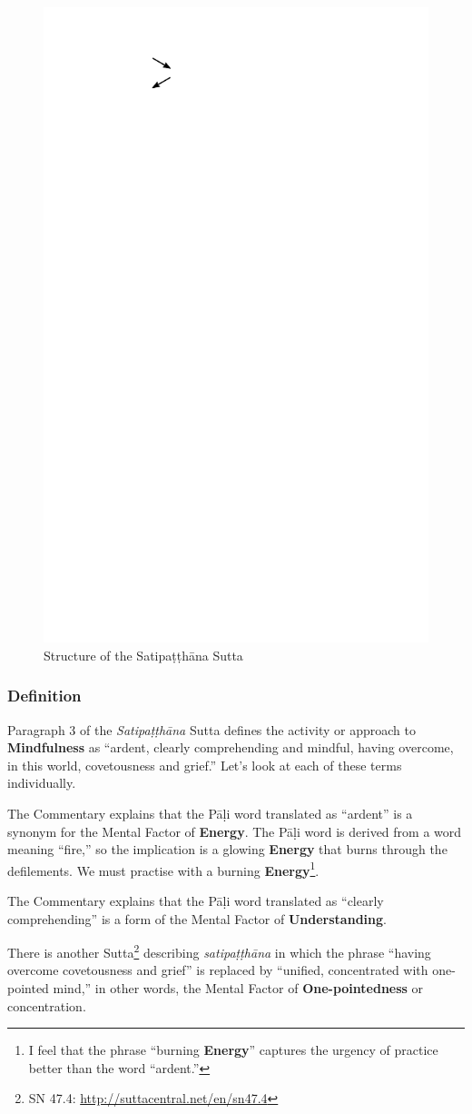 \begin{figure}[H]
\centering
\includegraphics[width=0.5\linewidth]{./Diagrams/Sati}
\caption{Structure of the Satipaṭṭhāna Sutta}
\label{fig:Sati}
\end{figure}

\subsubsection*{Definition}

Paragraph 3 of the \textit{Satipaṭṭhāna} Sutta defines the activity or approach to \textbf{Mindfulness} as “ardent, clearly comprehending and mindful, having overcome, in this world, covetousness and grief.” Let’s look at each of these terms individually.

The Commentary explains that the Pāḷi word translated as “ardent” is a synonym for the Mental Factor of \textbf{Energy}. The Pāḷi word is derived from a word meaning “fire,” so the implication is a glowing \textbf{Energy} that burns through the defilements. We must \color{blue} practise\color{black} with a burning \textbf{Energy}\footnote{I feel that the phrase “burning \textbf{Energy}” captures the urgency of \color{blue} practice\color{black} better than the word “ardent.”}.

The Commentary explains that the Pāḷi word translated as “clearly comprehending” is a form of the Mental Factor of \textbf{Understanding}.

There is another Sutta\footnote{SN 47.4: \url{http://suttacentral.net/en/sn47.4}} describing \textit{satipaṭṭhāna} in which the phrase “having overcome covetousness and grief” is replaced by “unified, concentrated with one-pointed mind,” in other words, the Mental Factor of \textbf{One-pointedness} or concentration.

